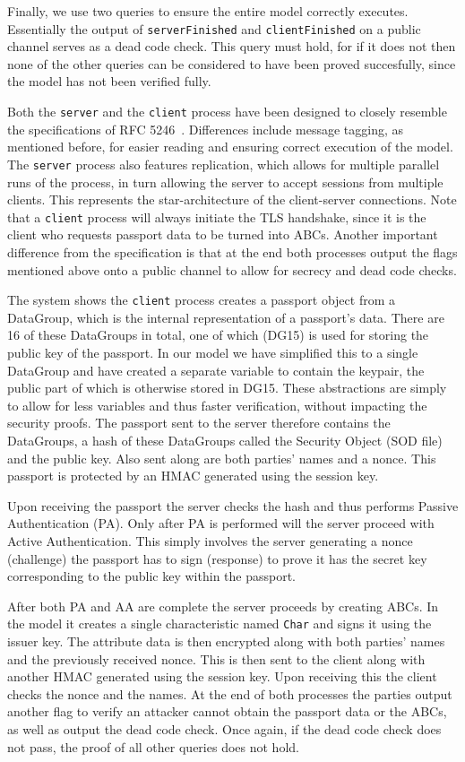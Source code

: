 Finally, we use two queries to ensure the entire model correctly executes. Essentially the output of \texttt{serverFinished} and \texttt{clientFinished} on a public channel serves as a dead code check. This query must hold, for if it does not then none of the other queries can be considered to have been proved succesfully, since the model has not been verified fully.

Both the \texttt{server} and the \texttt{client} process have been designed to closely resemble the specifications of RFC 5246~\cite{tls1.2}. Differences include message tagging, as mentioned before, for easier reading and ensuring correct execution of the model. The \texttt{server} process also features replication, which allows for multiple parallel runs of the process, in turn allowing the server to accept sessions from multiple clients. This represents the star-architecture of the client-server connections. Note that a \texttt{client} process will always initiate the TLS handshake, since it is the client who requests passport data to be turned into ABCs. Another important difference from the specification is that at the end both processes output the flags mentioned above onto a public channel to allow for secrecy and dead code checks.

The system shows the \texttt{client} process creates a passport object from a DataGroup, which is the internal representation of a passport's data. There are 16 of these DataGroups in total, one of which (DG15) is used for storing the public key of the passport. In our model we have simplified this to a single DataGroup and have created a separate variable to contain the keypair, the public part of which is otherwise stored in DG15. These abstractions are simply to allow for less variables and thus faster verification, without impacting the security proofs. The passport sent to the server therefore contains the DataGroups, a hash of these DataGroups called the Security Object (SOD file) and the public key. Also sent along are both parties' names and a nonce. This passport is protected by an HMAC generated using the session key.

Upon receiving the passport the server checks the hash and thus performs Passive Authentication (PA). Only after PA is performed will the server proceed with Active Authentication. This simply involves the server generating a nonce (challenge) the passport has to sign (response) to prove it has the secret key corresponding to the public key within the passport. 

After both PA and AA are complete the server proceeds by creating ABCs. In the model it creates a single characteristic named \texttt{Char} and signs it using the issuer key. The attribute data is then encrypted along with both parties' names and the previously received nonce. This is then sent to the client along with another HMAC generated using the session key. Upon receiving this the client checks the nonce and the names. At the end of both processes the parties output another flag to verify an attacker cannot obtain the passport data or the ABCs, as well as output the dead code check. Once again, if the dead code check does not pass, the proof of all other queries does not hold.

